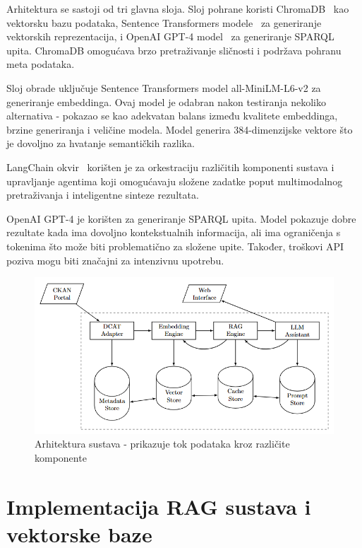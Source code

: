 Arhitektura se sastoji od tri glavna sloja. Sloj pohrane koristi ChromaDB~\cite{wang2023vector} kao vektorsku bazu podataka, Sentence Transformers modele~\cite{reimers2019sentence} za generiranje vektorskih reprezentacija, i OpenAI GPT-4 model~\cite{brown2020language} za generiranje SPARQL upita. ChromaDB omogućava brzo pretraživanje sličnosti i podržava pohranu meta podataka.

Sloj obrade uključuje Sentence Transformers model all-MiniLM-L6-v2 za generiranje embeddinga. Ovaj model je odabran nakon testiranja nekoliko alternativa - pokazao se kao adekvatan balans između kvalitete embeddinga, brzine generiranja i veličine modela. Model generira 384-dimenzijske vektore što je dovoljno za hvatanje semantičkih razlika.

LangChain okvir~\cite{liu2023survey} korišten je za orkestraciju različitih komponenti sustava i upravljanje agentima koji omogućavaju složene zadatke poput multimodalnog pretraživanja i inteligentne sinteze rezultata.

OpenAI GPT-4 je korišten za generiranje SPARQL upita. Model pokazuje dobre rezultate kada ima dovoljno kontekstualnih informacija, ali ima ograničenja s tokenima što može biti problematično za složene upite. Također, troškovi API poziva mogu biti značajni za intenzivnu upotrebu.

\begin{figure}[htbp]
    \centering
    \includegraphics[width=1\textwidth]{figures/system_architecture.png}
    \caption{Arhitektura sustava - prikazuje tok podataka kroz različite komponente}
    \label{fig:system_architecture}
\end{figure}

\section{Implementacija RAG sustava i vektorske baze}

